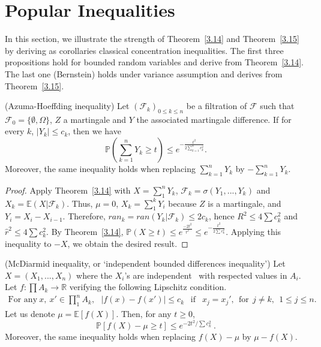 \section{Popular Inequalities}

In this section, we illustrate the strength of Theorem~\ref{3.14} and Theorem~\ref{3.15} by deriving as corollaries classical concentration inequalities.
The first three propositions hold for bounded random variables and derive from Theorem~\ref{3.14}. The last one (Bernstein) holds under variance assumption and derives from Theorem~\ref{3.15}.

\begin{proposition} ({\sc Azuma-Hoeffding inequality})
\label{HA3.10}
Let $(\mathcal{F}_k)_{0\leq k \leq n}$ be a filtration of $\mathcal{F}$ such that $\mathcal{F}_0 =  \{\emptyset , \Omega\} $, $Z$ a martingale and $Y$ the associated martingale difference.
If for every $k$, $|Y_{k}| \leq c_{k}$, then we have $$ \mathbb{P}(\sum_{k=1}^n Y_k \geq t) \leq e^{-\frac{t^2}{2 \sum_{k=1}^n c_k^2}}.$$ Moreover, the same inequality holds when replacing $\sum_{k=1}^n Y_k$ by $-\sum_{k=1}^n Y_k$.
\end{proposition}

\begin{proof}
Apply Theorem~\ref{3.14} with $X=\sum_{1}^{n}Y_k$, $\mathcal{F}_k=\sigma(Y_1,...,Y_k)$ and $X_k=\mathbb{E}(X|\mathcal{F}_k)$.
Thus, $\mu=0$, $X_k=\sum_{1}^{k}Y_i $ because $Z$ is a martingale, and $Y_i=X_i-X_{i-1}$.
Therefore, $ran_k=ran(Y_k|\mathcal{F}_k) \leq 2c_k$, hence $R^2 \leq 4 \sum c_k^2$ and $\hat r^2 \leq 4 \sum c_k^2$.
By Theorem~\ref{3.14}, $\mathbb{P}(X \geq t) \leq e^{\frac{-2t^2}{\hat r^2}} \leq e^{-\frac{t^2}{2\sum c_k^2}}.$
Applying this inequality to $-X$, we obtain the desired result. %
\end{proof}

\begin{proposition} ({\sc McDiarmid inequality, or `independent bounded differences inequality'})
\label{mcdiarmid}
Let $X=(X_1,...,X_n)$ where the $X_i$'s are independent \rv~with respected values in $A_i$.
Let $f : \prod A_k \rightarrow \mathbb{R}$ verifying the following Lipschitz condition.
\begin{align}
\text{For any}~ x,~x' \in \prod_{1}^{n} A_k,~~~ |f(x)-f(x')| \leq c_k ~~\text{ if }~~  x_j = x_j',~~\text{for} ~~j\neq k,~~ 1\le j\le n.
\label{CL}
\end{align} 
Let us denote $\mu=\mathbb{E}\left[f(X)\right]$.
Then, for any $t \geq 0$, %
$$ \mathbb{P}\left[f(X)-\mu \geq t\right] \leq e^{-2t^2/\sum c_k^2}~.$$ Moreover, the same inequality holds when replacing $f(X)-\mu$ by $\mu - f(X)$.
\end{proposition}


